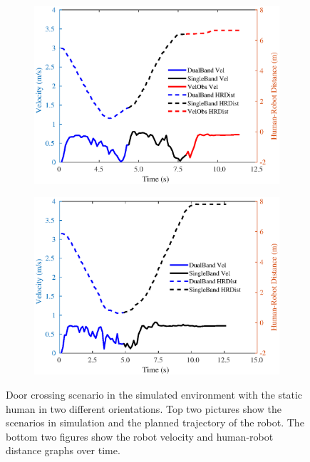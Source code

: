 \begin{figure}[h!]
\begin{subfigure}{.45\columnwidth}
\end{subfigure}
\begin{subfigure}{.45\columnwidth}
  \includegraphics[width=\textwidth]{images/chapter4/door_1.eps}
\end{subfigure}
\hspace{-0.25cm}
\begin{subfigure}{.45\columnwidth}
  \includegraphics[width=\textwidth]{images/chapter4/door_2.eps} 
\end{subfigure}
\caption{Door crossing scenario in the simulated environment with the static human in two different orientations. Top two pictures show the scenarios in simulation and the planned trajectory of the robot. The bottom two figures show the robot velocity and human-robot distance graphs over time.}
\label{fig:door_cross_static}
\end{figure}

